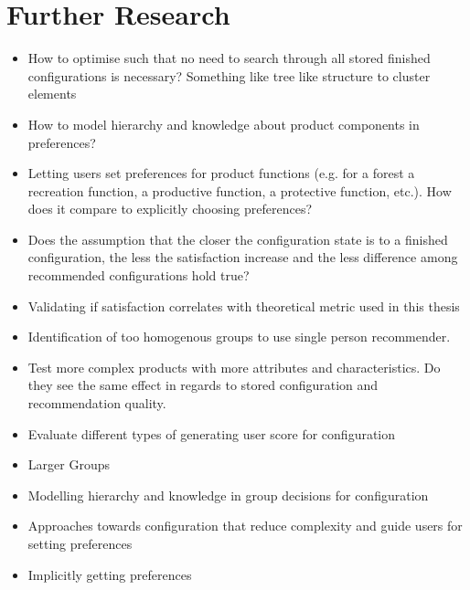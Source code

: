 \section{Further Research}
\label{sec:Conclusion:PossibleExtensions}

\begin{itemize}
    \item How to optimise such that no need to search through all stored finished configurations is necessary? Something like tree like structure to cluster elements
    \item How to model hierarchy and knowledge about product components in preferences?
    \item Letting users set preferences for product functions (e.g. for a forest a recreation function, a productive function, a protective function, etc.). How does it compare to explicitly choosing preferences?
    \item Does the assumption that the closer the configuration state is to a finished configuration, the less the satisfaction increase and the less difference among recommended configurations hold true?
    \item Validating if satisfaction correlates with theoretical metric used in this thesis
    \item Identification of too homogenous groups to use single person recommender.
    \item Test more complex products with more attributes and characteristics. Do they see the same effect in regards to stored configuration and recommendation quality.
    \item Evaluate different types of generating user score for configuration
    \item Larger Groups
    \item Modelling hierarchy and knowledge in group decisions for configuration
    \item Approaches towards configuration that reduce complexity and guide users for setting preferences
    \item Implicitly getting preferences
\end{itemize}
